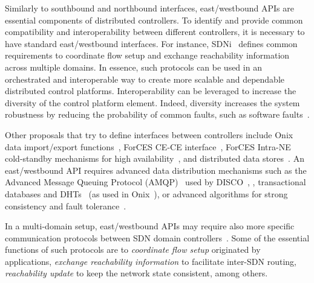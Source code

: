Similarly to southbound and northbound interfaces, east/westbound APIs are essential components of 
distributed controllers. 
To identify and provide common compatibility and interoperability between 
different controllers, it is necessary to have standard east/westbound interfaces. 
For instance, SDNi~\cite{yin2012} defines 
common requirements to coordinate flow setup and exchange reachability information across multiple 
domains. 
In essence, such protocols can be used in an orchestrated and interoperable 
way to create more scalable and dependable distributed control platforms. Interoperability can be 
leveraged to increase the diversity of the control platform element. Indeed, diversity increases the 
system robustness by reducing the probability of common faults, such as software faults~\cite{garcia2013}.

Other proposals that try to define interfaces between controllers include Onix data import/export functions~\cite{koponen-1}, ForCES CE-CE interface~\cite{doria2010,wang2011-1}, 
ForCES Intra-NE cold-standby mechanisms for high availability~\cite{ogawa2013}, and distributed data stores~\cite{botelho2013}. 
An east/westbound API requires advanced data distribution mechanisms such as the Advanced Message Queuing Protocol  (AMQP)~\cite{vinoski2006} used by
DISCO~\cite{phemius2013}, , transactional databases and DHTs~\cite{ghodsi2006} (as used in Onix~\cite{koponen-1}), or advanced algorithms for strong consistency and fault 
tolerance~\cite{botelho2013,Botelho2014}.

In a multi-domain setup, east/westbound APIs may require also more specific communication protocols 
between SDN domain controllers~\cite{stallings2013}. Some of the essential functions of such 
protocols are to \textit{coordinate flow setup} originated by applications, \textit{exchange reachability 
information} to facilitate inter-SDN routing, \textit{reachability update} to keep the network state 
consistent, among others.

